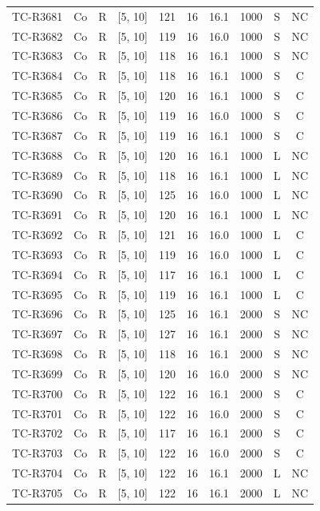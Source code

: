 \begin{longtable}{lccccccccc}
TC-R3681 & Co & R & [5, 10] & 121 & 16 & 16.1 & 1000 & S & NC \\
TC-R3682 & Co & R & [5, 10] & 119 & 16 & 16.0 & 1000 & S & NC \\
TC-R3683 & Co & R & [5, 10] & 118 & 16 & 16.1 & 1000 & S & NC \\
TC-R3684 & Co & R & [5, 10] & 118 & 16 & 16.1 & 1000 & S & C \\
TC-R3685 & Co & R & [5, 10] & 120 & 16 & 16.1 & 1000 & S & C \\
TC-R3686 & Co & R & [5, 10] & 119 & 16 & 16.0 & 1000 & S & C \\
TC-R3687 & Co & R & [5, 10] & 119 & 16 & 16.1 & 1000 & S & C \\
TC-R3688 & Co & R & [5, 10] & 120 & 16 & 16.1 & 1000 & L & NC \\
TC-R3689 & Co & R & [5, 10] & 118 & 16 & 16.1 & 1000 & L & NC \\
TC-R3690 & Co & R & [5, 10] & 125 & 16 & 16.0 & 1000 & L & NC \\
TC-R3691 & Co & R & [5, 10] & 120 & 16 & 16.1 & 1000 & L & NC \\
TC-R3692 & Co & R & [5, 10] & 121 & 16 & 16.0 & 1000 & L & C \\
TC-R3693 & Co & R & [5, 10] & 119 & 16 & 16.0 & 1000 & L & C \\
TC-R3694 & Co & R & [5, 10] & 117 & 16 & 16.1 & 1000 & L & C \\
TC-R3695 & Co & R & [5, 10] & 119 & 16 & 16.1 & 1000 & L & C \\
TC-R3696 & Co & R & [5, 10] & 125 & 16 & 16.1 & 2000 & S & NC \\
TC-R3697 & Co & R & [5, 10] & 127 & 16 & 16.1 & 2000 & S & NC \\
TC-R3698 & Co & R & [5, 10] & 118 & 16 & 16.1 & 2000 & S & NC \\
TC-R3699 & Co & R & [5, 10] & 120 & 16 & 16.0 & 2000 & S & NC \\
TC-R3700 & Co & R & [5, 10] & 122 & 16 & 16.1 & 2000 & S & C \\
TC-R3701 & Co & R & [5, 10] & 122 & 16 & 16.0 & 2000 & S & C \\
TC-R3702 & Co & R & [5, 10] & 117 & 16 & 16.1 & 2000 & S & C \\
TC-R3703 & Co & R & [5, 10] & 122 & 16 & 16.0 & 2000 & S & C \\
TC-R3704 & Co & R & [5, 10] & 122 & 16 & 16.1 & 2000 & L & NC \\
TC-R3705 & Co & R & [5, 10] & 122 & 16 & 16.1 & 2000 & L & NC \\

\end{longtable}
